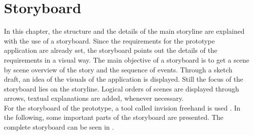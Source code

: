 \section{Storyboard}
In this chapter, the structure and the details of the main storyline are explained with the use of a storyboard. Since the requirements for the prototype application are already set, the storyboard points out the details of the requirements in a visual way.
The main objective of a storyboard is to get a scene by scene overview of the story and the sequence of events. Through a sketch draft, an idea of the visuals of the application is displayed. Still the focus of the storyboard lies on the storyline. Logical orders of scenes are displayed through arrows, textual explanations are added, whenever necessary.\\
For the storyboard of the prototype, a tool called invision freehand is used \cite{TODO}. In the following, some important parts of the storyboard are presented. The complete storyboard can be seen in \cite{TODO}.
